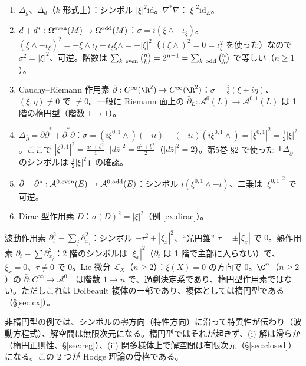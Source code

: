 \begin{ex}[楕円型の例]\label{ex:ellipticlist}
\begin{enumerate}
\item $\Delta_g$、$\Delta_d$（$k$ 形式上）：シンボル $|\xi|^2\mathrm{id}$。$\nabla^*\nabla$：$|\xi|^2\mathrm{id}_E$。
\item $d+d^*:\Omega^{\rm even}(M)\to\Omega^{\rm odd}(M)$：$\sigma=i(\xi\wedge-\iota_\xi)$。$(\xi\wedge-\iota_\xi)^2=-\xi\wedge\iota_\xi-\iota_\xi\xi\wedge=-|\xi|^2$（$(\xi\wedge)^2=0=\iota_\xi^2$ を使った）なので $\sigma^2=|\xi|^2$、可逆。階数は $\sum_{k\ \rm even}\binom nk=2^{n-1}=\sum_{k\ \rm odd}\binom nk$ で等しい（$n\ge1$）。
\item Cauchy--Riemann 作用素 $\bar\partial:C^\infty(\R^2)\to C^\infty(\R^2)$：$\sigma=\frac i2(\xi+i\eta)$、$(\xi,\eta)\ne0$ で $\neq0$。一般に Riemann 面上の $\bar\partial_L:\mathcal A^0(L)\to\mathcal A^{0,1}(L)$ は 1 階の楕円型（階数 $1\to1$）。
\item $\Delta_{\bar\partial}=\bar\partial\bar\partial^*+\bar\partial^*\bar\partial$：$\sigma=(i\xi^{0,1}\wedge)(-i\iota)+(-i\iota)(i\xi^{0,1}\wedge)=|\xi^{0,1}|^2=\frac12|\xi|^2$。ここで $|\xi^{0,1}|^2=\frac{a^2+b^2}4\cdot|d\bar z|^2=\frac{a^2+b^2}{2}$（$|d\bar z|^2=2$）。第5巻 \S2 で使った「$\Delta_{\bar\partial}$ のシンボルは $\frac12|\xi|^2$」の確認。
\item $\bar\partial+\bar\partial^*:\mathcal A^{0,\rm even}(E)\to\mathcal A^{0,\rm odd}(E)$：シンボル $i(\xi^{0,1}\wedge-\iota)$、二乗は $|\xi^{0,1}|^2$ で可逆。
\item Dirac 型作用素 $D$：$\sigma(D)^2=|\xi|^2$（例 \ref{ex:dirac}）。
\end{enumerate}
\end{ex}
\begin{ex}[楕円型でない例]\label{ex:nonell}
波動作用素 $\partial_t^2-\sum_j\partial_{x_j}^2$：シンボル $-\tau^2+|\xi_x|^2$、``光円錐'' $\tau=\pm|\xi_x|$ で $0$。熱作用素 $\partial_t-\sum\partial_{x_j}^2$：2 階のシンボルは $|\xi_x|^2$（$\partial_t$ は 1 階で主部に入らない）で、$\xi_x=0$、$\tau\neq0$ で $0$。Lie 微分 $\mathcal L_X$（$n\ge2$）：$\xi(X)=0$ の方向で $0$。$\C^n$（$n\ge2$）の $\bar\partial:C^\infty\to\mathcal A^{0,1}$ は階数 $1\to n$ で、過剰決定系であり、楕円型作用素ではない。ただしこれは Dolbeault 複体の一部であり、複体としては楕円型である（\S\ref{sec:cx}）。
\end{ex}
\begin{rem}[なぜ楕円型を考えるか]
非楕円型の例では、シンボルの零方向（特性方向）に沿って特異性が伝わり（波動方程式）、解空間は無限次元になる。楕円型ではそれが起きず、(i) 解は滑らか（楕円正則性、\S\ref{sec:reg}）、(ii) 閉多様体上で解空間は有限次元（\S\ref{sec:closed}）になる。この 2 つが Hodge 理論の骨格である。
\end{rem}

